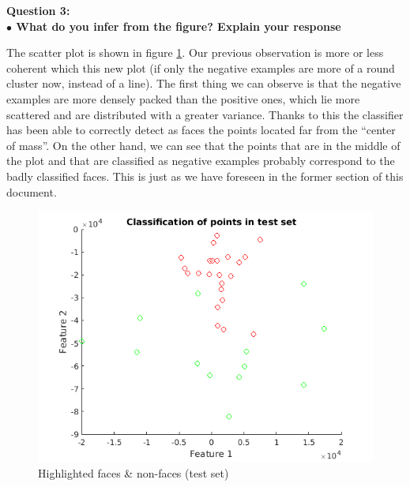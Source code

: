 {\noindent\bfseries Question 3: \\ \indent $ \bullet $ What do you infer from the figure? Explain your response}

The scatter plot is shown in figure \ref{fig:feattestscatter}. Our previous observation is more or less coherent which this new plot (if only the negative examples are more of a round cluster now, instead of a line). The first thing we can observe is that the negative examples are more densely packed than the positive ones, which lie more scattered and are distributed with a greater variance. Thanks to this the classifier has been able to correctly detect as faces the points located far from the ``center of mass''. On the other hand, we can see that the points that are in the middle of the plot and that are classified as negative examples probably correspond to the badly classified faces. This is just as we have foreseen in the former section of this document.

\begin{figure}[h!tb]
	\centering
		\includegraphics[width=0.6 \textwidth]{./img/ex1/feattestscatter.png}
	\caption{Highlighted faces \& non-faces (test set)}
	\label{fig:feattestscatter}
\end{figure}